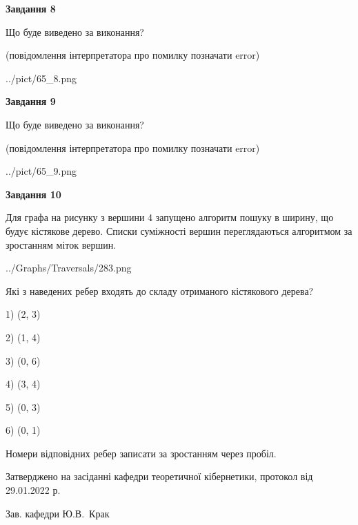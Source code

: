 \documentclass[12pt, ukrainian]{article}
\begin{document}
{\begin {large}
{\begin {center}\textbf{Завдання 8}\end {center}}\par
Що буде виведено за виконання?\par
 (повідомлення інтерпретатора про помилку позначати error)
\begin{center}
	{../pict/65_8.png}
\end{center}
\newpage

{\begin {center}\textbf{Завдання 9}\end {center}}\par
Що буде виведено за виконання?\par
 (повідомлення інтерпретатора про помилку позначати error)\par
\begin{center}
	{../pict/65_9.png}
\end{center}
\newpage

{\begin {center}\textbf{Завдання 10}\end {center}}\par
Для графа на рисунку з вершини 4 запущено алгоритм пошуку в ширину, що будує кістякове дерево. Списки суміжності вершин переглядаються алгоритмом за зростанням міток вершин.\par
\begin{center}
	{../Graphs/Traversals/283.png}
\end{center}
\par Які з наведених ребер входять до складу отриманого кістякового дерева?\par
1) (2, 3)\par
2) (1, 4)\par
3) (0, 6)\par
4) (3, 4)\par
5) (0, 3)\par
6) (0, 1)\par
{\vskip 15pt} Номери відповідних ребер записати за зростанням через пробіл.\par
\newpage


\end {large}
}
{\smallskip \begin {small} Затверджено на засіданні кафедри теоретичної кібернетики, протокол  від   29.01.2022 р.\par\smallskip\smallskip
{\parbox {6.5 cm}{Зав. кафедри \dotfill Ю.В.~Крак}} \end{small}}
\end{document}
